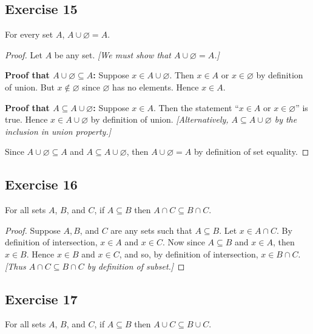 \documentclass[14pt]{extarticle}
\newcommand{\es}{\varnothing}
\begin{document}
\subsection{Exercise 15}
For every set $A$, \(A \cup \es = A\).

\begin{proof}
  Let $A$ be any set. {\it [We must show that \(A \cup \es = A\).]}

    {\bf Proof that \(A \cup \es \subseteq A\):} Suppose \(x \in A \cup \es\). Then \(x \in A\) or \(x \in \es\) by
  definition of union. But \(x \notin \es\) since $\es$ has no elements. Hence $x \in A$.

    {\bf Proof that \(A \subseteq A \cup \es\):} Suppose \(x \in A\). Then the statement “\(x \in A\) or \(x \in \es\)”
  is true. Hence \(x \in A \cup \es\) by definition of union. {\it [Alternatively, \(A \subseteq A \cup \es\) by the
        inclusion in union property.]}

  Since \(A \cup \es \subseteq A\) and \(A \subseteq A \cup \es\), then \(A \cup \es = A\) by definition of set equality.
\end{proof}

\subsection{Exercise 16}
For all sets $A$, $B$, and $C$, if \(A \subseteq B\) then \(A \cap C \subseteq B \cap C\).

\begin{proof}
  Suppose $A, B$, and $C$ are any sets such that \(A \subseteq B\). Let \(x \in A \cap C\). By definition of
  intersection, \(x \in A\) and \(x \in C\). Now since \(A \subseteq B\) and \(x \in A\), then \(x \in B\). Hence
  \(x \in B\) and \(x \in C\), and so, by definition of intersection, \(x \in B \cap C\). {\it [Thus
        \(A \cap C \subseteq B \cap C\) by definition of subset.]}
\end{proof}

\subsection{Exercise 17}
For all sets $A$, $B$, and $C$, if \(A \subseteq B\) then \(A \cup C \subseteq B \cup C\).
\end{document}
